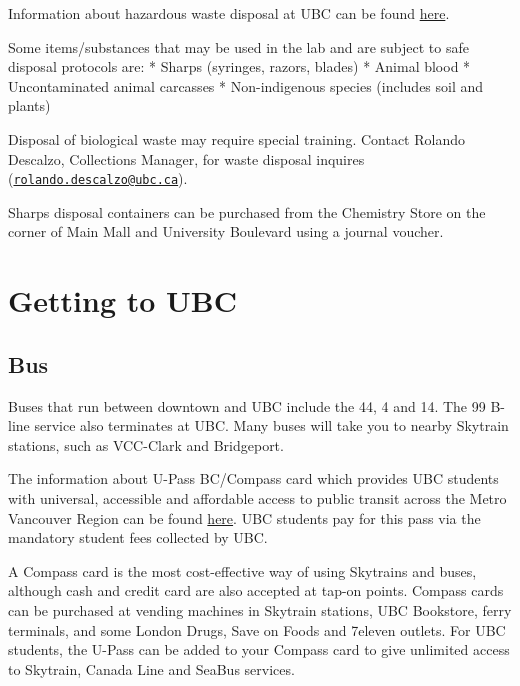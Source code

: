 \documentclass[
]{book}
\begin{document}
Information about hazardous waste disposal at UBC can be found \href{https://srs.ubc.ca/environment/hazardous-waste-management/hazardous-waste-manual/}{here}.

Some items/substances that may be used in the lab and are subject to safe disposal protocols are:
* Sharps (syringes, razors, blades)
* Animal blood
* Uncontaminated animal carcasses
* Non-indigenous species (includes soil and plants)

Disposal of biological waste may require special training. Contact Rolando Descalzo, Collections Manager, for waste disposal inquires (\href{mailto:rolando.descalzo@ubc.ca}{\nolinkurl{rolando.descalzo@ubc.ca}}).

Sharps disposal containers can be purchased from the Chemistry Store on the corner of Main Mall and University Boulevard using a journal voucher.

\hypertarget{transportation}{%
\chapter*{Getting to UBC}\label{transportation}}

\hypertarget{bus}{%
\section{Bus}\label{bus}}

Buses that run between downtown and UBC include the 44, 4 and 14. The 99 B-line service also terminates at UBC. Many buses will take you to nearby Skytrain stations, such as VCC-Clark and Bridgeport.

The information about U-Pass BC/Compass card which provides UBC students with universal, accessible and affordable access to public transit across the Metro Vancouver Region can be found \href{https://planning.ubc.ca/transportation/transit/u-pass-compass-card}{here}. UBC students pay for this pass via the mandatory student fees collected by UBC.

A Compass card is the most cost-effective way of using Skytrains and buses, although cash and credit card are also accepted at tap-on points. Compass cards can be purchased at vending machines in Skytrain stations, UBC Bookstore, ferry terminals, and some London Drugs, Save on Foods and 7eleven outlets. For UBC students, the U-Pass can be added to your Compass card to give unlimited access to Skytrain, Canada Line and SeaBus services.
\end{document}
